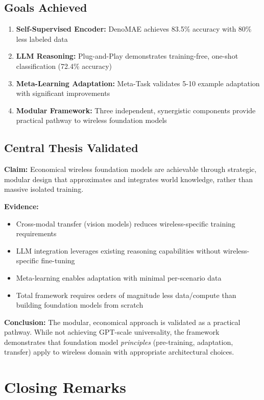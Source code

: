 \subsection{Goals Achieved}

\begin{enumerate}
    \item \textbf{Self-Supervised Encoder:} DenoMAE achieves 83.5\% accuracy with 80\% less labeled data
    \item \textbf{LLM Reasoning:} Plug-and-Play demonstrates training-free, one-shot classification (72.4\% accuracy)
    \item \textbf{Meta-Learning Adaptation:} Meta-Task validates 5-10 example adaptation with significant improvements
    \item \textbf{Modular Framework:} Three independent, synergistic components provide practical pathway to wireless foundation models
\end{enumerate}

\subsection{Central Thesis Validated}

\textbf{Claim:} Economical wireless foundation models are achievable through strategic, modular design that approximates and integrates world knowledge, rather than massive isolated training.

\textbf{Evidence:}
\begin{itemize}
    \item Cross-modal transfer (vision models) reduces wireless-specific training requirements
    \item LLM integration leverages existing reasoning capabilities without wireless-specific fine-tuning
    \item Meta-learning enables adaptation with minimal per-scenario data
    \item Total framework requires orders of magnitude less data/compute than building foundation models from scratch
\end{itemize}

\textbf{Conclusion:} The modular, economical approach is validated as a practical pathway. While not achieving GPT-scale universality, the framework demonstrates that foundation model \textit{principles} (pre-training, adaptation, transfer) apply to wireless domain with appropriate architectural choices.

\section{Closing Remarks}

